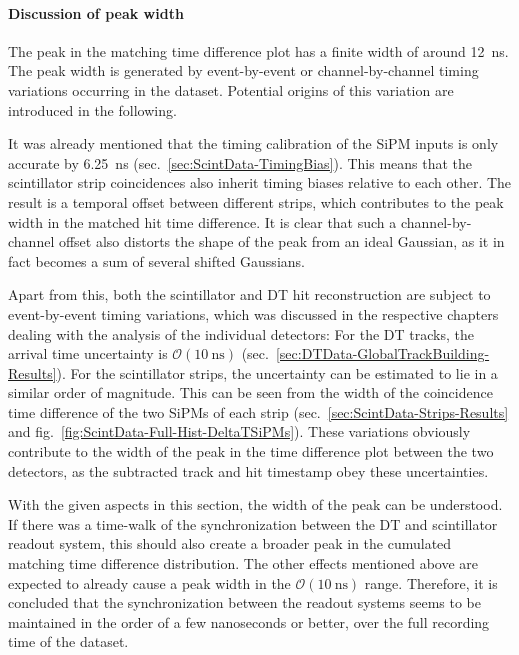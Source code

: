 \paragraph{Discussion of peak width}
The peak in the matching time difference plot has a finite width of around \SI{12}{\nano\second}. The peak width is generated by event-by-event or channel-by-channel timing variations occurring in the dataset. Potential origins of this variation are introduced in the following.
\par It was already mentioned that the timing calibration of the \ac{SiPM} inputs is only accurate by \SI{6.25}{\nano\second} (sec.\ \ref{sec:ScintData-TimingBias}). This means that the scintillator strip coincidences also inherit timing biases relative to each other. The result is a temporal offset between different strips, which contributes to the peak width in the matched hit time difference. It is clear that such a channel-by-channel offset also distorts the shape of the peak from an ideal Gaussian, as it in fact becomes a sum of several shifted Gaussians.
\par Apart from this, both the scintillator and \ac{DT} hit reconstruction are subject to event-by-event timing variations, which was discussed in the respective chapters dealing with the analysis of the individual detectors: For the \ac{DT} tracks, the arrival time uncertainty is $\mathcal{O}(\SI{10}{\nano\second})$ (sec.\ \ref{sec:DTData-GlobalTrackBuilding-Results}). For the scintillator strips, the uncertainty can be estimated to lie in a similar order of magnitude. This can be seen from the width of the coincidence time difference of the two \acp{SiPM} of each strip (sec.\ \ref{sec:ScintData-Strips-Results} and fig.\ \ref{fig:ScintData-Full-Hist-DeltaTSiPMs}). These variations obviously contribute to the width of the peak in the time difference plot between the two detectors, as the subtracted track and hit timestamp obey these uncertainties.
\par With the given aspects in this section, the width of the peak can be understood. If there was a time-walk of the synchronization between the \ac{DT} and scintillator readout system, this should also create a broader peak in the cumulated matching time difference distribution. The other effects mentioned above are expected to already cause a peak width in the $\mathcal{O}(\SI{10}{\nano\second})$ range. Therefore, it is concluded that the synchronization between the readout systems seems to be maintained in the order of a few nanoseconds or better, over the full recording time of the dataset.
